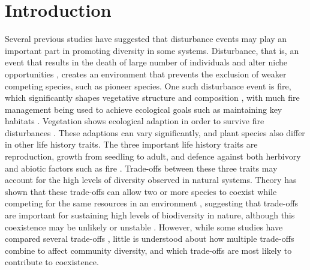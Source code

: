 \documentclass[a4paper]{article}
\begin{document}
\section{Introduction}\label{intro}
Several previous studies \citep[e.g.][]{denslow1987tropical,sousa1984role} have suggested that disturbance events may play an important part in promoting diversity in some systems. Disturbance, that is, an event that results in the death of large number of individuals and alter niche opportunities \citep{shea2004moving}, creates an environment that prevents the exclusion of weaker competing species, such as pioneer species. One such disturbance event is fire, which significantly shapes vegetative structure and composition \citep[e.g.][]{debano1998fire,hart2005post}, with much fire management being used to achieve ecological goals such as maintaining key habitats \citep{avitabile2013systematic}. Vegetation shows ecological adaption in order to survive fire disturbances \citep[e.g.][]{agee1996fire,keeley2011fire}. These adaptions can vary significantly, and plant species also differ in other life history traits. The three important life history traits are reproduction, growth from seedling to adult, and defence against both herbivory and abiotic factors such as fire \citep{bazzaz1987allocating}. Trade-offs between these three traits may account for the high levels of diversity observed in natural systems. Theory has shown that these trade-offs can allow two or more species to coexist while competing for  the same resources in an environment \citep[e.g.][]{kisdi2003coexistence,levins1971regional,bonsall2004life}, suggesting that trade-offs are important for sustaining high levels of biodiversity in nature, although this coexistence may be unlikely or unstable \citep{nattrass2012quantifying,gyllenberg2005impossibility}. However, while some studies have compared several trade-offs \citep[e.g.][]{tilman1990constraints,grime1977evidence}, little is understood about how multiple trade-offs combine to affect community diversity, and which trade-offs are most likely to contribute to coexistence.
\end{document}
